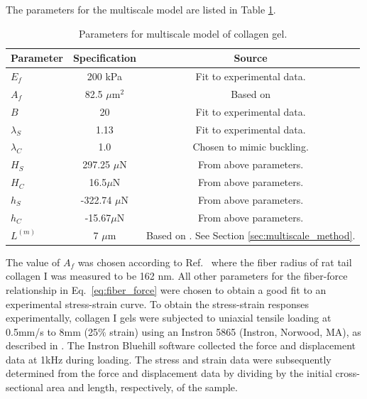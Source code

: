\documentclass[]{interact}
\begin{document}
The parameters for the multiscale model are listed in Table \ref{table:multiscale_parameters}.
\begin{table}[ht]
\begin{center}
\begin{tabular}{ l c c }
\hline \hline
Parameter & Specification & Source \\
\hline 
$E_f$ & 200 kPa & Fit to experimental data. \\
$A_f$ & 82.5 $\mu$m$^2$ & Based on \cite{Dutov:2016gu} \\
$B$ & 20 & Fit to experimental data. \\
$\lambda_S$ &1.13 & Fit to experimental data. \\
$\lambda_C$ & 1.0 & Chosen to mimic buckling. \\ 
$H_S$ & 297.25 $\mu$N & From above parameters.\\
$H_C$ & 16.5$\mu$N & From above parameters. \\
$h_S$ & -322.74 $\mu$N & From above parameters. \\
$h_C$ & -15.67$\mu$N & From above parameters. \\
$L^{(m)}$ & 7 $\mu$m & Based on \cite{Lindstrom:2013gd}. See Section \ref{sec:multiscale_method}.\\ 
\hline \hline
\end{tabular}
\end{center}
\caption{Parameters for multiscale model of collagen gel.}
\label{table:multiscale_parameters}
\end{table}
The value of $A_f$ was chosen according to Ref.\  where the fiber radius of rat tail collagen I was measured to be 162 nm.  All other parameters for the fiber-force relationship in Eq.\ \eqref{eq:fiber_force} were chosen to obtain a good fit to an experimental stress-strain curve. To obtain the stress-strain responses experimentally, collagen I gels were subjected to uniaxial tensile loading at 0.5mm/s to 8mm (25$\%$ strain) using an Instron 5865 (Instron, Norwood, MA), as described in  \cite{Zhang:2016ga}. The Instron Bluehill software collected the force and displacement data at 1kHz during loading. The stress and strain data were subsequently determined from the force and displacement data by dividing by the initial cross-sectional area and length, respectively, of the sample. 
\end{document}
